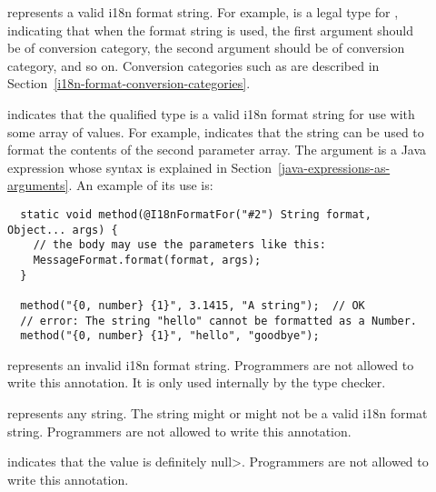 \begin{description}

\item[]
  represents a valid i18n format string. For example,
   is a legal type for
  , indicating that when the format
  string is used,
  the first argument should be of  conversion category,
  the second argument should be of  conversion category, and so on.
  Conversion categories such as  are described in
  Section~\ref{i18n-format-conversion-categories}.

\item[]
  indicates that the qualified type is a valid i18n format string for use
  with some array of values.  For example,
   indicates that the string can be used to
  format the contents of the second parameter array.
  The argument is a Java expression whose syntax
  is explained in Section~\ref{java-expressions-as-arguments}.
  An example of its use is:

\begin{Verbatim}
  static void method(@I18nFormatFor("#2") String format, Object... args) {
    // the body may use the parameters like this:
    MessageFormat.format(format, args);
  }

  method("{0, number} {1}", 3.1415, "A string");  // OK
  // error: The string "hello" cannot be formatted as a Number.
  method("{0, number} {1}", "hello", "goodbye");
\end{Verbatim}

\item[]
  represents an invalid i18n format string. Programmers are not allowed to
  write this annotation. It is only used internally by the type checker.

\item[]
  represents any string.  The string might or might not be a valid i18n
  format string.  Programmers are not allowed to write this annotation.

\item[]
  indicates that the value is definitely \<null>. Programmers are not allowed
  to write this annotation.
\end{description}

